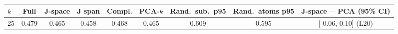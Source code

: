 \begin{tabular}{lcccccccc}\toprule
$k$ & Full & J-space & J span & Compl. & PCA-$k$ & Rand.\ sub.\ p95 & Rand.\ atoms p95 & J-space $-$ PCA (95\% CI)\\\midrule
25 & 0.479 & 0.465 & 0.458 & 0.468 & 0.465 & 0.609 & 0.595 & [-0.06, 0.10] (L20)\\
\bottomrule\end{tabular}
